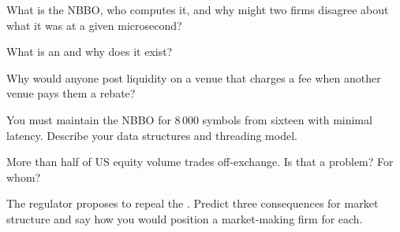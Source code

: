\begin{interviewq}\label{iq:m1:us-equity-market-structure:1}
What is the NBBO, who computes it, and why might two firms disagree about
what it was at a given microsecond?
\end{interviewq}

\begin{interviewq}\label{iq:m1:us-equity-market-structure:2}
What is an  and why does it exist?
\end{interviewq}

\begin{interviewq}\label{iq:m1:us-equity-market-structure:3}
Why would anyone post liquidity on a venue that charges  a fee when
another venue pays them a rebate?
\end{interviewq}

\begin{interviewq}\label{iq:m1:us-equity-market-structure:4}
You must maintain the NBBO for 8\,000 symbols from sixteen  with
minimal latency. Describe your data structures and threading model.
\end{interviewq}

\begin{interviewq}\label{iq:m1:us-equity-market-structure:5}
More than half of US equity volume trades off-exchange. Is that a problem?
For whom?
\end{interviewq}

\begin{interviewq}\label{iq:m1:us-equity-market-structure:6}
The regulator proposes to repeal the . Predict three
consequences for market structure and say how you would position a
market-making firm for each.
\end{interviewq}
